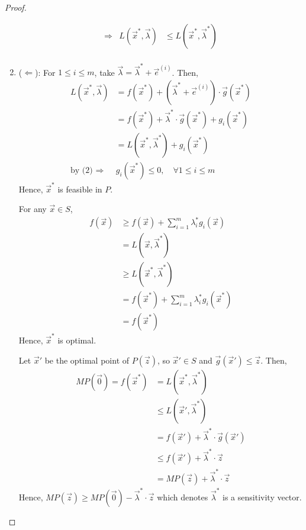 \documentclass[11pt,a4paper]{article}
\begin{document}
\begin{proof}
\begin{enumerate}[$\bullet$]
\begin{equation}
\begin{aligned}
               &\Rightarrow& L(\vec{x}^*,\vec{\lambda})&\leq L(\vec{x}^*,\vec{\lambda}^*)&\\
            \end{aligned}
            \nonumber
        \end{equation}
        \item ($\Leftarrow$): For $1\leq i\leq m$, take $\vec{\lambda}=\vec{\lambda}^*+\vec{e}^{(i)}$. Then,
        \begin{equation}
            \begin{aligned}
                L(\vec{x}^*,\vec{\lambda})&=f(\vec{x}^*)+\left(\vec{\lambda}^*+\vec{e}^{(i)}\right)\cdot \vec{g}(\vec{x}^*)\\
                &=f(\vec{x}^*)+\vec{\lambda}^*\cdot \vec{g}(\vec{x}^*)+ g_i(\vec{x}^*)\\
                &=L(\vec{x}^*,\vec{\lambda}^*)+g_i(\vec{x}^*)\\
                \text{by (2) }\Rightarrow\ &g_i(\vec{x}^*)\leq 0,\quad \forall 1\leq i\leq m
            \end{aligned}
            \nonumber
        \end{equation}
        Hence, $\vec{x}^*$ is feasible in $P$.

        For any $\vec{x}\in S$,
        \begin{equation}
            \begin{aligned}
                f(\vec{x})&\geq f(\vec{x})+\sum_{i=1}^m\lambda_i^* g_i(\vec{x})\\
                &=L(\vec{x},\vec{\lambda}^*)\\
                &\geq L(\vec{x}^*,\vec{\lambda}^*)\\
                &=f(\vec{x}^*)+\sum_{i=1}^m\lambda_i^* g_i(\vec{x}^*)\\
                &=f(\vec{x}^*)
            \end{aligned}
            \nonumber
        \end{equation}
        Hence, $\vec{x}^*$ is optimal.

        Let $\vec{x}'$ be the optimal point of $P(\vec{z})$, so $\vec{x}'\in S$ and $\vec{g}(\vec{x}')\leq \vec{z}$. Then,
        \begin{equation}
            \begin{aligned}
                MP(\vec{0})=f(\vec{x}^*)&=L(\vec{x}^*,\vec{\lambda}^*)\\
                &\leq L(\vec{x}',\vec{\lambda}^*)\\
                &= f(\vec{x}')+\vec{\lambda}^*\cdot \vec{g}(\vec{x}')\\
                &\leq f(\vec{x}')+\vec{\lambda}^*\cdot \vec{z}\\
                &=MP(\vec{z})+\vec{\lambda}^*\cdot \vec{z}
            \end{aligned}
            \nonumber
        \end{equation}
        Hence, $MP(\vec{z})\geq MP(\vec{0})-\vec{\lambda}^*\cdot \vec{z}$ which denotes $\vec{\lambda}^*$ is a sensitivity vector.
    \end{enumerate}
\end{proof}
\end{document}
